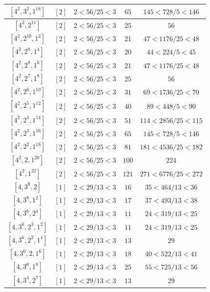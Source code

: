 \documentclass{article}%
\begin{document}
\begin{center}
\begin{longtable}{||c|c|c|c|c||}
$[4^{2}, 3^{2}, 1^{16}]$ & $[2]$ & $2 < 56/25 < 3$ & $65$ & $145 < 728/5 < 146$ \\ \hline 
$[4^{2}, 2^{11}]$ & $[2]$ & $2 < 56/25 < 3$ & $25$ & $56$ \\ \hline 
$[4^{2}, 2^{10}, 1^{2}]$ & $[2]$ & $2 < 56/25 < 3$ & $21$ & $47 < 1176/25 < 48$ \\ \hline 
$[4^{2}, 2^{9}, 1^{4}]$ & $[2]$ & $2 < 56/25 < 3$ & $20$ & $44 < 224/5 < 45$ \\ \hline 
$[4^{2}, 2^{8}, 1^{6}]$ & $[2]$ & $2 < 56/25 < 3$ & $21$ & $47 < 1176/25 < 48$ \\ \hline 
$[4^{2}, 2^{7}, 1^{8}]$ & $[2]$ & $2 < 56/25 < 3$ & $25$ & $56$ \\ \hline 
$[4^{2}, 2^{6}, 1^{10}]$ & $[2]$ & $2 < 56/25 < 3$ & $31$ & $69 < 1736/25 < 70$ \\ \hline 
$[4^{2}, 2^{5}, 1^{12}]$ & $[2]$ & $2 < 56/25 < 3$ & $40$ & $89 < 448/5 < 90$ \\ \hline 
$[4^{2}, 2^{4}, 1^{14}]$ & $[2]$ & $2 < 56/25 < 3$ & $51$ & $114 < 2856/25 < 115$ \\ \hline 
$[4^{2}, 2^{3}, 1^{16}]$ & $[2]$ & $2 < 56/25 < 3$ & $65$ & $145 < 728/5 < 146$ \\ \hline 
$[4^{2}, 2^{2}, 1^{18}]$ & $[2]$ & $2 < 56/25 < 3$ & $81$ & $181 < 4536/25 < 182$ \\ \hline 
$[4^{2}, 2, 1^{20}]$ & $[2]$ & $2 < 56/25 < 3$ & $100$ & $224$ \\ \hline 
$[4^{2}, 1^{22}]$ & $[2]$ & $2 < 56/25 < 3$ & $121$ & $271 < 6776/25 < 272$ \\ \hline 
$[4, 3^{8}, 2]$ & $[1]$ & $2 < 29/13 < 3$ & $16$ & $35 < 464/13 < 36$ \\ \hline 
$[4, 3^{8}, 1^{2}]$ & $[1]$ & $2 < 29/13 < 3$ & $17$ & $37 < 493/13 < 38$ \\ \hline 
$[4, 3^{6}, 2^{4}]$ & $[1]$ & $2 < 29/13 < 3$ & $11$ & $24 < 319/13 < 25$ \\ \hline 
$[4, 3^{6}, 2^{3}, 1^{2}]$ & $[1]$ & $2 < 29/13 < 3$ & $11$ & $24 < 319/13 < 25$ \\ \hline 
$[4, 3^{6}, 2^{2}, 1^{4}]$ & $[1]$ & $2 < 29/13 < 3$ & $13$ & $29$ \\ \hline 
$[4, 3^{6}, 2, 1^{6}]$ & $[1]$ & $2 < 29/13 < 3$ & $18$ & $40 < 522/13 < 41$ \\ \hline 
$[4, 3^{6}, 1^{8}]$ & $[1]$ & $2 < 29/13 < 3$ & $25$ & $55 < 725/13 < 56$ \\ \hline 
$[4, 3^{4}, 2^{7}]$ & $[1]$ & $2 < 29/13 < 3$ & $13$ & $29$ \\ \hline 

\end{longtable}
\end{center}
\end{document}
